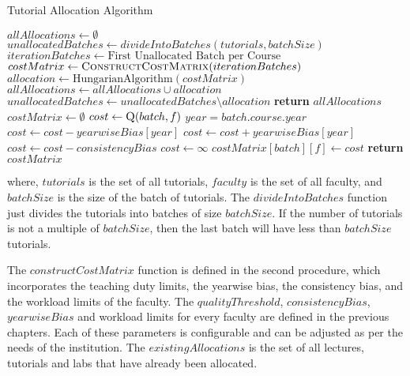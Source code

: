 \begin{algorithm}[H]
  \caption{Tutorial Allocation Algorithm}
  \begin{algorithmic}
    \State $allAllocations \gets \emptyset$
    \State $unallocatedBatches \gets divideIntoBatches(tutorials, batchSize)$
    \State $iterationBatches \gets \text{First Unallocated Batch per Course}$
    \State $costMatrix \gets \Call{ConstructCostMatrix}{iterationBatches}$
    \State $allocation \gets \text{HungarianAlgorithm}(costMatrix)$
    \State $allAllocations \gets allAllocations \cup allocation$
    \State $unallocatedBatches \gets unallocatedBatches \setminus allocation$
    \EndWhile
    \State \textbf{return} $allAllocations$
    \EndProcedure
    \\
    \State $costMatrix \gets \emptyset$
    \State $cost \gets \Call{Q}{batch, f}$
    \State $year = batch.course.year$
    \State $cost \gets cost - yearwiseBias[year]$
    \Else
    \State $cost \gets cost + yearwiseBias[year]$
    \EndIf
    \State $cost \gets cost - consistencyBias$
    \EndIf
    \State $cost \gets \infty$
    \EndIf
    \State $costMatrix[batch][f] \gets cost$
    \EndFor
    \EndFor
    \State \textbf{return} $costMatrix$
    \EndProcedure
  \end{algorithmic}
  \label{alg:tutorial_allocation}
\end{algorithm}

where, $tutorials$ is the set of all tutorials, $faculty$ is the set of all faculty, and $batchSize$ is the size of the batch of tutorials. The $divideIntoBatches$ function just divides the tutorials into batches of size $batchSize$. If the number of tutorials is not a multiple of $batchSize$, then the last batch will have less than $batchSize$ tutorials.

The $constructCostMatrix$ function is defined in the second procedure, which incorporates the teaching duty limits, the yearwise bias, the consistency bias, and the workload limits of the faculty. The $qualityThreshold$, $consistencyBias$, $yearwiseBias$ and workload limits for every faculty are defined in the previous chapters. Each of these parameters is configurable and can be adjusted as per the needs of the institution. The $existingAllocations$ is the set of all lectures, tutorials and labs that have already been allocated.

